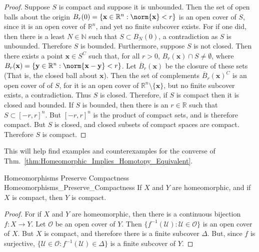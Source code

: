             \begin{proof}
                Suppose $S$ is compact and suppose it is unbounded. Then the
                set of open balls about the origin
                $B_{r}(0)=\{\mathbf{x}\in\mathbb{R}^{n}:\norm{\mathbf{x}}<r\}$
                is an open cover of $S$, since it is an open cover of
                $\mathbb{R}^{n}$, and yet no finite subcover exists. For if
                one did, then there is a least $N\in\mathbb{N}$ such that
                $S\subset{B_{N}(0)}$, a contradiction as $S$ is unbounded.
                Therefore $S$ is bounded. Furthermore, suppose $S$ is
                not closed. Then there exists a point $\mathbf{x}\in{S^{C}}$
                such that, for all $r>0$,
                $B_{r}(\mathbf{x})\cap{S}\ne\emptyset$, where
                $B_{r}(\mathbf{x})=\{\mathbf{y}\in\mathbb{R}^{n}:%
                 \norm{\mathbf{x}-\mathbf{y}}<r\}$.
                Let $\overline{B}_{r}(\mathbf{x})$ be the closure of these sets
                (That is, the closed ball about $\mathbf{x}$). Then the set of
                complements $\overline{B}_{r}(\mathbf{x})^{C}$ is an open cover
                of of $S$, for it is an open cover of
                $\mathbb{R}^{n}\setminus\{\mathbf{x}\}$, but no finite subcover
                exists, a contradiction. Thus $S$ is closed. Therefore, if $S$
                is compact then it is closed and bounded. If $S$ is bounded,
                then there is an $r\in\mathbb{R}$ such that
                $S\subset[-r,r]^{n}$. But $[-r,r]^{n}$ is the product of compact
                sets, and is therefore compact. But $S$ is closed, and closed
                subsets of compact spaces are compact. Therefore $S$ is compact.
            \end{proof}
            This will help find examples and counterexamples for the converse of
            Thm.~\ref{thm:Homeomorphic_Implies_Homotopy_Equivalent}.
            \begin{ltheorem}{Homeomorphisms Preserve Compactness}
                            {Homeomorphisms_Preserve_Compactness}
                If $X$ and $Y$ are homeomorphic, and if $X$ is compact,
                then $Y$ is compact.
            \end{ltheorem}
            \begin{proof}
                For if $X$ and $Y$ are homeomorphic, then there
                is a continuous bijection $f:X\rightarrow{Y}$.
                Let $\mathcal{O}$ be an open cover of $Y$.
                Then $\{f^{-1}(\mathcal{U}):\mathcal{U}\in\mathcal{O}\}$
                is an open cover of $X$. But $X$ is compact, and therefore
                there is a finite subcover $\Delta$. But, since $f$ is
                surjective,
                $\{\mathcal{U}\in\mathcal{O}:f^{-1}(\mathcal{U})\in\Delta\}$
                is a finite subcover of $Y$.
            \end{proof}
